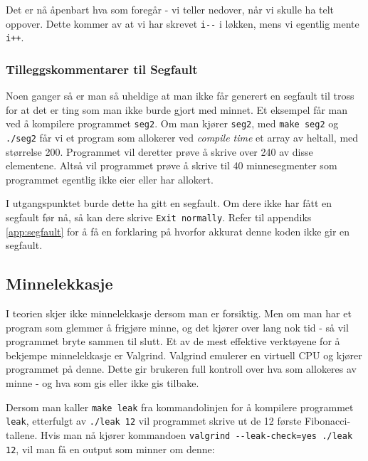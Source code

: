 Det er nå åpenbart hva som foregår - vi teller nedover, når vi skulle ha telt oppover. Dette kommer av at vi har skrevet \verb|i--| i løkken, mens vi egentlig mente \verb|i++|.

\subsubsection{Tilleggskommentarer til Segfault}

Noen ganger så er man så uheldige at man ikke får generert en segfault til tross for at det er ting som man ikke burde gjort med minnet. Et eksempel får man ved å kompilere programmet \verb|seg2|. Om man kjører \verb|seg2|, med \verb|make seg2| og \verb|./seg2| får vi et program som allokerer ved \textit{compile time} et array av heltall, med størrelse 200. Programmet vil deretter prøve å skrive over 240 av disse elementene. Altså vil programmet prøve å skrive til 40 minnesegmenter som programmet egentlig ikke eier eller har allokert. 

I utgangspunktet burde dette ha gitt en segfault. Om dere ikke har fått en segfault før nå, så kan dere skrive \verb|Exit normally|. Refer til appendiks \ref{app:segfault} for å få en forklaring på hvorfor akkurat denne koden ikke gir en segfault.

\subsection{Minnelekkasje}

I teorien skjer ikke minnelekkasje dersom man er forsiktig. Men om man har et program som glemmer å frigjøre minne, og det kjører over lang nok tid - så vil programmet bryte sammen til slutt. Et av de mest effektive verktøyene for å bekjempe minnelekkasje er Valgrind. Valgrind emulerer en virtuell CPU og kjører programmet på denne. Dette gir brukeren full kontroll over hva som allokeres av minne - og hva som gis eller ikke gis tilbake.

Dersom man kaller \verb|make leak| fra kommandolinjen for å kompilere programmet \verb|leak|, etterfulgt av \verb|./leak 12| vil programmet skrive ut de 12 første Fibonacci-tallene. Hvis man nå kjører kommandoen \verb|valgrind --leak-check=yes ./leak 12|, vil man få en output som minner om denne:

